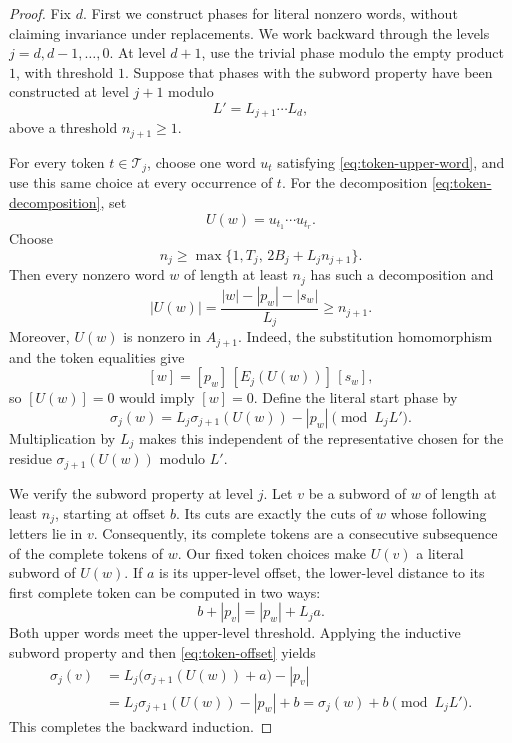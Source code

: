 \begin{proof}
Fix $d$.  First we construct phases for literal nonzero words, without
claiming invariance under replacements.  We work backward through the
levels $j=d,d-1,\ldots,0$.  At level $d+1$, use the trivial phase
modulo the empty product $1$, with threshold $1$.  Suppose that phases
with the subword property have been constructed at level $j+1$ modulo
\[
 L'=L_{j+1}\cdots L_d,
\]
above a threshold $n_{j+1}\geq1$.

For every token $t\in\mathcal T_j$, choose one word $u_t$ satisfying
\eqref{eq:token-upper-word}, and use this same choice at every
occurrence of $t$.  For the decomposition
\eqref{eq:token-decomposition}, set
\[
 U(w)=u_{t_1}\cdots u_{t_r}.
\]
Choose
\begin{equation}\label{eq:literal-threshold}
 n_j\geq\max\{1,T_j,\,2B_j+L_j n_{j+1}\}.
\end{equation}
Then every nonzero word $w$ of length at least $n_j$ has such a
decomposition and
\[
 |U(w)|=\frac{|w|-|p_w|-|s_w|}{L_j}\geq n_{j+1}.
\]
Moreover, $U(w)$ is nonzero in $A_{j+1}$.  Indeed, the substitution
homomorphism and the token equalities give
\[
 [w]=[p_w]\,[E_j(U(w))]\,[s_w],
\]
so $[U(w)]=0$ would imply $[w]=0$.  Define the literal start phase by
\begin{equation}\label{eq:phase-induction}
 \sigma_j(w)=L_j\sigma_{j+1}(U(w))-|p_w|
 \pmod{L_jL'}.
\end{equation}
Multiplication by $L_j$ makes this independent of the representative
chosen for the residue $\sigma_{j+1}(U(w))$ modulo $L'$.

We verify the subword property at level $j$.  Let $v$ be a subword of
$w$ of length at least $n_j$, starting at offset $b$.  Its cuts are
exactly the cuts of $w$ whose following letters lie in $v$.
Consequently, its complete tokens are a consecutive
subsequence of the complete tokens of $w$.  Our fixed token choices
make $U(v)$ a literal subword of $U(w)$.  If $a$ is its upper-level
offset, the lower-level distance to its first complete token can be
computed in two ways:
\begin{equation}\label{eq:token-offset}
 b+|p_v|=|p_w|+L_j a.
\end{equation}
Both upper words meet the upper-level threshold.  Applying the
inductive subword property and then \eqref{eq:token-offset} yields
\begin{align*}
 \sigma_j(v)
 &=L_j\bigl(\sigma_{j+1}(U(w))+a\bigr)-|p_v|\\
 &=L_j\sigma_{j+1}(U(w))-|p_w|+b
 =\sigma_j(w)+b
 \pmod{L_jL'}.
\end{align*}
This completes the backward induction.


\end{proof}
